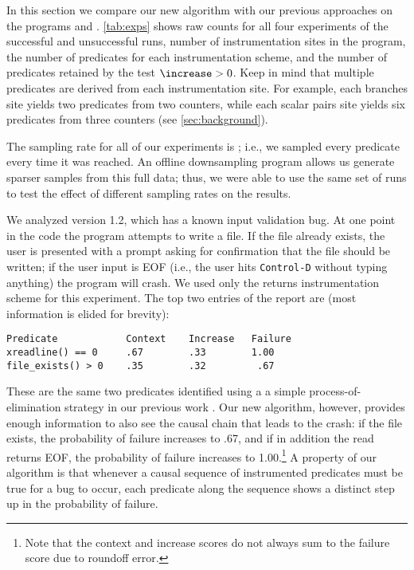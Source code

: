 


In this section we compare our new algorithm with our previous
approaches on the programs \ccrypt and \bc.
\autoref{tab:exps} shows raw counts for all four experiments of the
successful and unsuccessful runs, number of instrumentation sites in
the program, the number of predicates for each
instrumentation scheme, and the number of predicates retained by the
test $\increase > 0$.   Keep in mind that multiple predicates are
derived from each instrumentation site.  For example, each branches
site yields two predicates from two counters, while each scalar pairs
site yields six predicates from three counters (see \autoref{sec:background}).

The sampling rate for all of our experiments is ;
i.e., we sampled every predicate every time it was reached.  An
offline downsampling program allows us generate sparser samples from this
full data; thus, we were able to use the same set of runs to test the
effect of different sampling rates on the results.  

We analyzed \ccrypt version 1.2, which has a known input validation
bug.  At one point in the code the program attempts to write a file.
If the file already exists, the user is presented with a prompt asking
for confirmation that the file should be written; if the user input is
EOF (i.e., the user hits \texttt{Control-D} without typing anything) the
program will crash.  We used only the returns instrumentation scheme
for this experiment.  The top two entries of the report are (most
information is elided for brevity):
\begin{verbatim}
Predicate            Context    Increase   Failure
xreadline() == 0     .67        .33        1.00
file_exists() > 0    .35        .32         .67
\end{verbatim}

These are the same two predicates identified using a a simple process-of-elimination strategy in our previous work
\cite{PLDI`03*141}.  Our new algorithm, however, provides enough information to also see the causal chain that
leads to the crash: if the file exists, the probability of failure increases to .67, and if in addition the
read returns EOF, the probability of failure increases to 1.00.\footnote{Note that the context and increase scores do not always sum to the failure score due to roundoff error.}   A property of our algorithm is that 
whenever a causal sequence of instrumented predicates must be true for a bug to occur, each predicate along the
sequence shows a distinct step up in the probability of failure.

